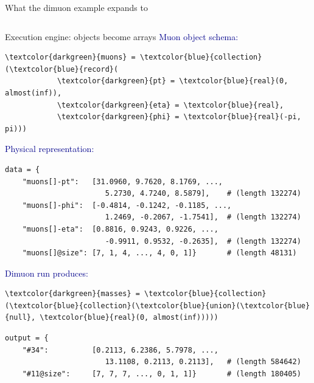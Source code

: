 \documentclass{beamer}
\begin{document}
\begin{frame}[fragile]{What the dimuon example expands to}
\begin{columns}[t]
\vspace{0.3 cm}
\hfill {}
\end{columns}
\end{frame}

\begin{frame}[fragile]{Execution engine: objects become arrays}
\vspace{0.3 cm}
\textcolor{darkblue}{\normalsize Muon object schema:}

\scriptsize
\begin{Verbatim}[commandchars=\\\{\}]
\textcolor{darkgreen}{muons} = \textcolor{blue}{collection}(\textcolor{blue}{record}(
            \textcolor{darkgreen}{pt} = \textcolor{blue}{real}(0, almost(inf)),
            \textcolor{darkgreen}{eta} = \textcolor{blue}{real},
            \textcolor{darkgreen}{phi} = \textcolor{blue}{real}(-pi, pi)))
\end{Verbatim}

\vspace{0.3 cm}
\textcolor{darkblue}{\normalsize Physical representation:}

\scriptsize
\begin{verbatim}
data = {
    "muons[]-pt":   [31.0960, 9.7620, 8.1769, ...,
                       5.2730, 4.7240, 8.5879],    # (length 132274)
    "muons[]-phi":  [-0.4814, -0.1242, -0.1185, ...,
                       1.2469, -0.2067, -1.7541],  # (length 132274)
    "muons[]-eta":  [0.8816, 0.9243, 0.9226, ...,
                       -0.9911, 0.9532, -0.2635],  # (length 132274)
    "muons[]@size": [7, 1, 4, ..., 4, 0, 1]}       # (length 48131)
\end{verbatim}

\vspace{0.3 cm}
\textcolor{darkblue}{\normalsize Dimuon run produces:}

\scriptsize
\begin{Verbatim}[commandchars=\\\{\}]
\textcolor{darkgreen}{masses} = \textcolor{blue}{collection}(\textcolor{blue}{collection}(\textcolor{blue}{union}(\textcolor{blue}{null}, \textcolor{blue}{real}(0, almost(inf)))))
\end{Verbatim}

\scriptsize
\begin{verbatim}
output = {
    "#34":          [0.2113, 6.2386, 5.7978, ...,
                       13.1108, 0.2113, 0.2113],   # (length 584642)
    "#11@size":     [7, 7, 7, ..., 0, 1, 1]}       # (length 180405)
\end{verbatim}
\end{frame}
\end{document}

